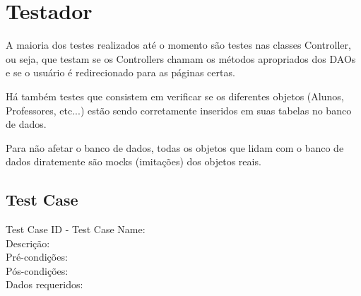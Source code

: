 \documentclass[12pt,letterpaper]{article}
\begin{document}



\pagebreak



\section{Testador}

A maioria dos testes realizados até o momento são testes nas classes Controller, ou seja, que testam se os Controllers chamam os métodos apropriados dos DAOs e se o usuário é redirecionado para as páginas certas. 

Há também testes que consistem em verificar se os diferentes objetos (Alunos, Professores, etc...) estão sendo corretamente inseridos em suas tabelas no banco de dados.

Para não afetar o banco de dados, todas os objetos que lidam com o banco de dados diratemente são mocks (imitações) dos objetos reais.

\subsection{Test Case}

\noindent Test Case ID - Test Case Name:\\
Descrição:\\ %
Pré-condições:\\ %
Pós-condições:\\ %
Dados requeridos:\\ %
\end{document}
